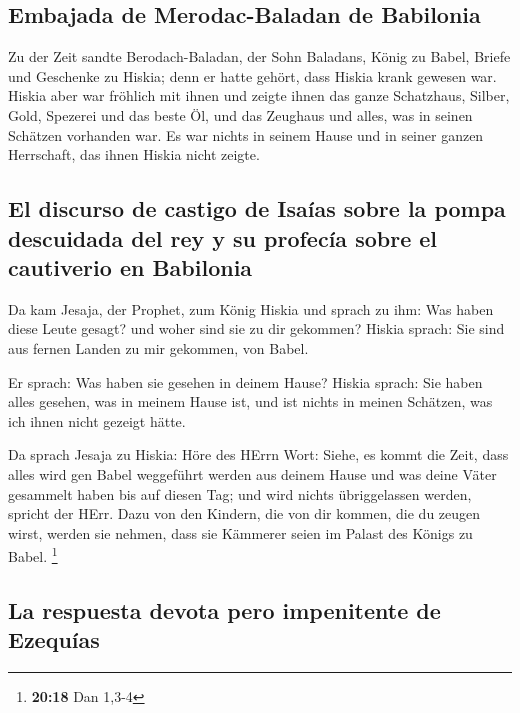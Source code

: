 \hypertarget{embajada-de-merodac-baladan-de-babilonia}{%
\subsection{Embajada de Merodac-Baladan de
Babilonia}\label{embajada-de-merodac-baladan-de-babilonia}}

 Zu der Zeit sandte Berodach-Baladan, der Sohn Baladans,
König zu Babel, Briefe und Geschenke zu Hiskia; denn er hatte gehört,
dass Hiskia krank gewesen war.  Hiskia aber war fröhlich
mit ihnen und zeigte ihnen das ganze Schatzhaus, Silber, Gold, Spezerei
und das beste Öl, und das Zeughaus und alles, was in seinen Schätzen
vorhanden war. Es war nichts in seinem Hause und in seiner ganzen
Herrschaft, das ihnen Hiskia nicht zeigte.

\hypertarget{el-discurso-de-castigo-de-isauxedas-sobre-la-pompa-descuidada-del-rey-y-su-profecuxeda-sobre-el-cautiverio-en-babilonia}{%
\subsection{El discurso de castigo de Isaías sobre la pompa descuidada
del rey y su profecía sobre el cautiverio en
Babilonia}\label{el-discurso-de-castigo-de-isauxedas-sobre-la-pompa-descuidada-del-rey-y-su-profecuxeda-sobre-el-cautiverio-en-babilonia}}

 Da kam Jesaja, der Prophet, zum König Hiskia und sprach
zu ihm: Was haben diese Leute gesagt? und woher sind sie zu dir
gekommen? Hiskia sprach: Sie sind aus fernen Landen zu mir gekommen, von
Babel.

 Er sprach: Was haben sie gesehen in deinem Hause? Hiskia
sprach: Sie haben alles gesehen, was in meinem Hause ist, und ist nichts
in meinen Schätzen, was ich ihnen nicht gezeigt hätte.

 Da sprach Jesaja zu Hiskia: Höre des HErrn Wort:
 Siehe, es kommt die Zeit, dass alles wird gen Babel
weggeführt werden aus deinem Hause und was deine Väter gesammelt haben
bis auf diesen Tag; und wird nichts übriggelassen werden, spricht der
HErr.  Dazu von den Kindern, die von dir kommen, die du
zeugen wirst, werden sie nehmen, dass sie Kämmerer seien im Palast des
Königs zu Babel. \footnote{\textbf{20:18} Dan 1,3-4}

\hypertarget{la-respuesta-devota-pero-impenitente-de-ezequuxedas}{%
\subsection{La respuesta devota pero impenitente de
Ezequías}\label{la-respuesta-devota-pero-impenitente-de-ezequuxedas}}


